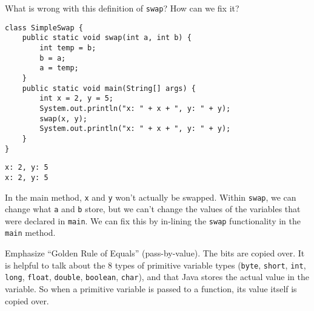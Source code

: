 \begin{blocksection}
\question What is wrong with this definition of \lstinline$swap$? How can we fix it?

\begin{lstlisting}
class SimpleSwap {
    public static void swap(int a, int b) {
        int temp = b;
        b = a;
        a = temp;
    }
    public static void main(String[] args) {
        int x = 2, y = 5;
        System.out.println("x: " + x + ", y: " + y);
        swap(x, y);
        System.out.println("x: " + x + ", y: " + y);
    }
}
\end{lstlisting}

\begin{solution}
\begin{verbatim}
x: 2, y: 5
x: 2, y: 5
\end{verbatim}
In the main method, \lstinline$x$ and \lstinline$y$ won't actually be swapped.
Within \lstinline$swap$, we can change what \lstinline$a$ and \lstinline$b$
store, but we can't change the values of the variables that were declared in
\lstinline$main$. We can fix this by in-lining the \lstinline$swap$
functionality in the \lstinline$main$ method.

\begin{meta}
Emphasize ``Golden Rule of Equals'' (pass-by-value). The bits are copied over.  It is helpful to talk about the 8 types of primitive variable
types (\lstinline$byte$, \lstinline$short$, \lstinline$int$, \lstinline$long$,
\lstinline$float$, \lstinline$double$, \lstinline$boolean$, \lstinline$char$),
and that Java stores the actual value in the variable. So when a primitive
variable is passed to a function, its value itself is copied over.
\end{meta}

\end{solution}


\end{blocksection}
